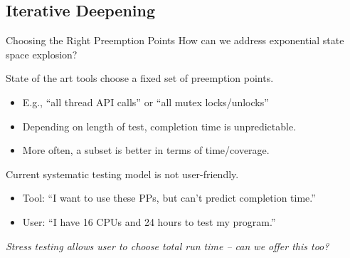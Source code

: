 \documentclass[xcolor=dvipsnames]{beamer}
\begin{document}
\subsection{Iterative Deepening}

\begin{frame}{Choosing the Right Preemption Points}
	How can we address exponential state space explosion?
	\pause
	\linegap

	State of the art tools choose a fixed set of preemption points.
	\begin{itemize}
		\item E.g., ``all thread API calls'' or ``all mutex locks/unlocks''
		\item Depending on length of test, completion time is unpredictable.
		\item More often, a subset is better in terms of time/coverage. 
	\end{itemize}
	\pause
	\linegap
	Current systematic testing model is not user-friendly.
	\begin{itemize}
		\item Tool: ``I want to use these PPs, but can't predict completion time.''
		\item User: ``I have 16 CPUs and 24 hours to test my program.''
	\end{itemize}
	\linegap
	{\em Stress testing allows user to choose total run time -- can we offer this too?}
\end{frame}

%
%
\end{document}
